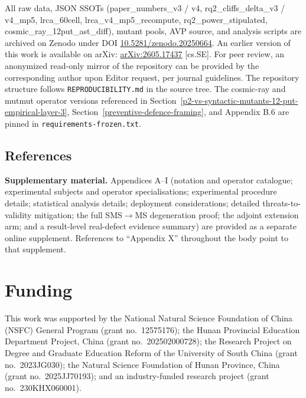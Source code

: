 \documentclass[12pt]{article}
\begin{document}
All raw data, JSON SSOTs (paper\_numbers\_v3 / v4,
rq2\_cliffs\_delta\_v3 / v4\_mp5, lrca\_60cell,
lrca\_v4\_mp5\_recompute, rq2\_power\_stipulated,
cosmic\_ray\_12put\_ast\_diff), mutant pools, AVP source, and analysis
scripts are archived on Zenodo under DOI
\href{https://doi.org/10.5281/zenodo.20250664}{10.5281/zenodo.20250664}.
An earlier version of this work is available on arXiv:
\href{https://arxiv.org/abs/2605.17437}{arXiv:2605.17437} [cs.SE].
For peer review, an anonymized read-only mirror of the repository can
be provided by the corresponding author upon Editor request, per journal
guidelines. The repository structure follows
\texttt{REPRODUCIBILITY.md} in the source tree. The cosmic-ray and
mutmut operator versions referenced in Section~\ref{p2-vs-syntactic-mutants-12-put-empirical-layer-3}, Section~\ref{preventive-defence-framing}, and Appendix B.6 are
pinned in \texttt{requirements-frozen.txt}.


\subsection{References}\label{references}




\clearpage

\textbf{Supplementary material.} Appendices A--I (notation and operator
catalogue; experimental subjects and operator specialisations; experimental
procedure details; statistical analysis details; deployment considerations;
detailed threats-to-validity mitigation; the full SMS$\to$MS degeneration
proof; the adjoint extension arm; and a result-level real-defect evidence
summary) are provided as a separate online
supplement. References to ``Appendix X'' throughout the body point to that
supplement.

\section*{Funding}

This work was supported by the National Natural Science Foundation of China (NSFC) General Program (grant no.\ 12575176); the Hunan Provincial Education Department Project, China (grant no.\ 202502000728); the Research Project on Degree and Graduate Education Reform of the University of South China (grant no.\ 2023JG030); the Natural Science Foundation of Hunan Province, China (grant no.\ 2025JJ70193); and an industry-funded research project (grant no.\ 230KHX060001).
\end{document}
